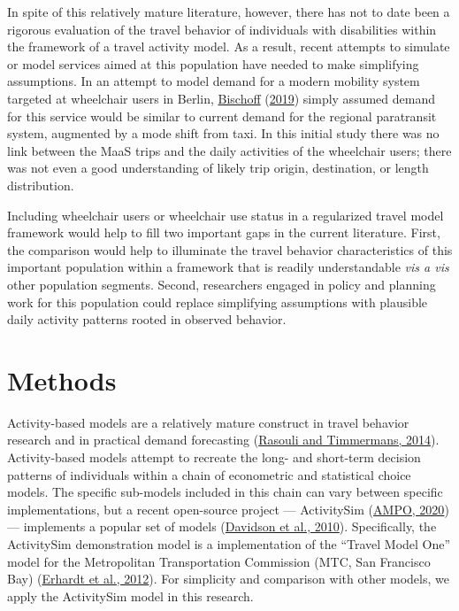\documentclass[3p, authoryear, review]{elsarticle} %
\begin{document}
In spite of this relatively mature literature, however, there has not to
date been a rigorous evaluation of the travel behavior of individuals with
disabilities within the framework of a travel activity model. As a result,
recent attempts to simulate or model services aimed at this population have
needed to make simplifying assumptions. In an attempt to model demand for a
modern mobility system targeted at wheelchair users in Berlin, \protect\hyperlink{ref-Bischoff2019}{Bischoff} (\protect\hyperlink{ref-Bischoff2019}{2019})
simply assumed demand for this service would be similar to current demand for
the regional paratransit system, augmented by a mode shift from taxi. In this
initial study there was no link between the MaaS trips and the daily activities
of the wheelchair users; there was not even a good understanding of likely trip
origin, destination, or length distribution.

Including wheelchair users or wheelchair use status in a regularized travel model
framework would help to fill two important gaps in the current literature. First,
the comparison would help to illuminate the travel behavior characteristics of
this important population within a framework that is readily understandable
\emph{vis a vis} other population segments. Second, researchers engaged in
policy and planning work for this population could replace simplifying assumptions
with plausible daily activity patterns rooted in observed behavior.

\hypertarget{methodology}{%
\section{Methods}\label{methodology}}

Activity-based models are a relatively mature construct in travel behavior
research and in practical demand forecasting (\protect\hyperlink{ref-rasouli2014activity}{Rasouli and Timmermans, 2014}). Activity-based models attempt
to recreate the long- and short-term decision patterns of individuals within a
chain of econometric and statistical choice models. The specific sub-models included
in this chain can vary between specific implementations, but a recent
open-source project --- ActivitySim (\protect\hyperlink{ref-activitysim}{AMPO, 2020}) --- implements a popular
set of models (\protect\hyperlink{ref-davidson2010ct}{Davidson et al., 2010}). Specifically, the ActivitySim demonstration
model is a implementation of the ``Travel Model One'' model for the Metropolitan
Transportation Commission (MTC, San Francisco Bay) (\protect\hyperlink{ref-erhardt2012mtc}{Erhardt et al., 2012}).
For simplicity and comparison with other models, we apply the ActivitySim model
in this research.
\end{document}
